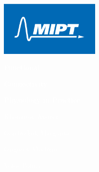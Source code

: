 \pagecolor{UoDDarkBlue}\afterpage{\nopagecolor}


\includegraphics[width=5cm]{MIPT.png}
\vspace*{1cm}

\fontsize{70}{75}\selectfont \textcolor{white}{\textbf{Functional}}

\fontsize{70}{75}\selectfont \textcolor{white}{\textbf{Connectivity}}


\vspace{10mm}
\Large\textcolor{white}{\textbf{Physiology in Practice}}

\vspace{120mm}

\normalsize
\textcolor{white}{Khomutov Andrey}

\textcolor{white}{Gordiychuk Margarita}

\textcolor{white}{Grigorev Vladimir}

\textcolor{white}{Volos Polina}


\thispagestyle{empty}



\restoregeometry   
\newpage
